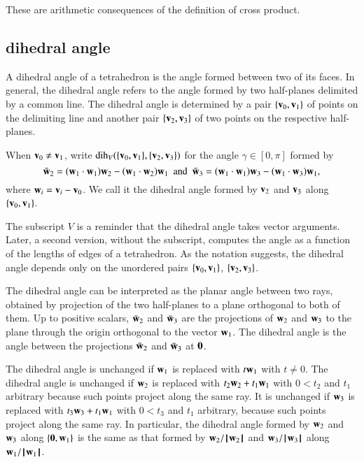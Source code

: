 \begin{proved}
These are arithmetic consequences of the definition of cross product.
\swallowed\end{proved}



\subsection{dihedral angle}

A dihedral angle of a tetrahedron is the angle formed between two of
its faces. In general, the dihedral angle refers to the angle formed
by two half-planes delimited by a common line.  The dihedral angle is
determined by a pair $\{{\mathbf v}_0,{\mathbf v}_1\}$ of points on the delimiting line
and another pair $\{{\mathbf v}_2,{\mathbf v}_3\}$ of two points on the respective
half-planes.  %
%
%
%
%

\begin{definition}\label{def:dih}
 When ${\mathbf v}_0\ne {\mathbf v}_1$,
  write $\operatorname{dih}_V(\{{\mathbf v}_0,{\mathbf v}_1\},\{{\mathbf v}_2,{\mathbf v}_3\})$ for the angle
  $\gamma\in[0,\pi]$ formed by
\[ 
\bar {{\mathbf w}}_2 = ({\mathbf w}_1\cdot {\mathbf w}_1) {\mathbf w}_2 - ({\mathbf w}_1\cdot {\mathbf w}_2) {\mathbf w}_1\text{ \ and \ }  \bar {{\mathbf w}}_3 =
({\mathbf w}_1\cdot {\mathbf w}_1) {\mathbf w}_3 - ({\mathbf w}_1\cdot {\mathbf w}_3) {\mathbf w}_1,
\] 
where ${\mathbf w}_i={\mathbf v}_i-{\mathbf v}_0$.  We call it
the dihedral angle formed by ${\mathbf v}_2$ and ${\mathbf v}_3$ along $\{{\mathbf v}_0,{\mathbf v}_1\}$.
%
%
\end{definition}
The subscript $V$ is a reminder 
that the dihedral angle takes vector arguments.
Later, a second version, without the subscript, 
computes the angle as a function of the lengths of edges of a 
tetrahedron.
%
%
As the notation suggests, the dihedral angle depends only
on the unordered pairs $\{{\mathbf v}_0,{\mathbf v}_1\}$, $\{{\mathbf v}_2,{\mathbf v}_3\}$.

The dihedral angle can be interpreted as the planar angle between two rays, obtained by
projection of the two half-planes to a plane orthogonal to both of
them.  Up to positive scalars, $\bar {{\mathbf w}}_2$ and $\bar {{\mathbf w}}_3$ are the
projections of ${\mathbf w}_2$ and ${\mathbf w}_3$ to the plane through the origin
orthogonal to the vector ${\mathbf w}_1$.  The dihedral angle is the angle
between the projections $\bar {{\mathbf w}}_2$ and $\bar {{\mathbf w}}_3$ at ${\mathbf 0}$.

\begin{remark}\label{rem:dih}
  The dihedral angle is unchanged if ${\mathbf w}_1$ is replaced with $t {\mathbf w}_1$ with
  $t\ne0$. The dihedral angle is unchanged if ${\mathbf w}_2$ is replaced with
  $t_2 {\mathbf w}_2 + t_1 {\mathbf w}_1$ with $0 < t_2$ and $t_1$ arbitrary because
  such points project along the same ray.  It is unchanged if ${\mathbf w}_3$ is
  replaced with $t_3 {\mathbf w}_3 + t_1 {\mathbf w}_1$ with $0 < t_3$ and $t_1$
  arbitrary, because such points project along the same ray.  In
  particular, the dihedral angle formed by ${\mathbf w}_2$ and ${\mathbf w}_3$ along
  $\{{\mathbf 0},{\mathbf w}_1\}$ is the same as that formed by ${\mathbf w}_2/{{\hskip0.1em|\hskip-0.15em|\hskip0.1em}{\mathbf w}_2{\hskip0.1em|\hskip-0.15em|\hskip0.1em}}$ and
  ${\mathbf w}_3/{{\hskip0.1em|\hskip-0.15em|\hskip0.1em}{\mathbf w}_3{\hskip0.1em|\hskip-0.15em|\hskip0.1em}}$ along ${\mathbf w}_1/{{\hskip0.1em|\hskip-0.15em|\hskip0.1em}{\mathbf w}_1{\hskip0.1em|\hskip-0.15em|\hskip0.1em}}$.
\end{remark}

